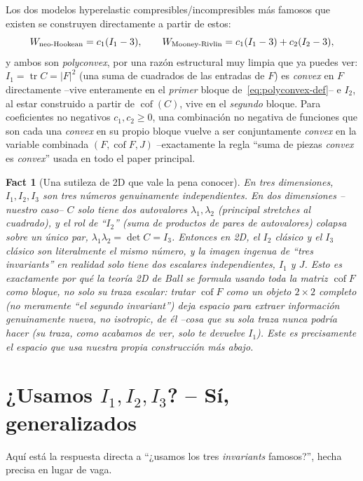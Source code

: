 \documentclass[11pt,a4paper]{article}
\newtheorem{fact}{Fact}
\newcommand{\Cof}{\operatorname{cof}}
\newcommand{\tr}{\operatorname{tr}}
\begin{document}
Los dos modelos hyperelastic compresibles/incompresibles m\'as famosos
que existen se construyen directamente a partir de estos:
\[
 W_{\rm neo\text{-}Hookean}=c_1(I_1-3), \qquad
 W_{\rm Mooney\text{-}Rivlin}=c_1(I_1-3)+c_2(I_2-3),
\]
y ambos son \emph{polyconvex}, por una raz\'on estructural muy limpia
que ya puedes ver: $I_1=\tr C=|F|^2$ (una suma de cuadrados de las
entradas de $F$) es \emph{convex} en $F$ directamente --vive
enteramente en el \emph{primer} bloque de~\eqref{eq:polyconvex-def}-- e
$I_2$, al estar construido a partir de $\Cof(C)$, vive en el
\emph{segundo} bloque. Para coeficientes no negativos $c_1,c_2\geq0$,
una combinaci\'on no negativa de funciones que son cada una \emph{convex}
en su propio bloque vuelve a ser conjuntamente \emph{convex} en la
variable combinada $(F,\Cof F,J)$ --exactamente la regla ``suma de
piezas \emph{convex} es \emph{convex}'' usada en todo el paper
principal.

\begin{fact}[Una sutileza de 2D que vale la pena conocer]
\label{fact:2d-degeneracy}
En tres dimensiones, $I_1,I_2,I_3$ son tres n\'umeros genuinamente
independientes. En dos dimensiones --nuestro caso-- $C$ solo tiene dos
autovalores $\lambda_1,\lambda_2$ (principal stretches al cuadrado), y
el rol de ``$I_2$'' (suma de productos de pares de autovalores) colapsa
sobre un \'unico par, $\lambda_1\lambda_2=\det C=I_3$. Entonces en 2D,
el $I_2$ cl\'asico y el $I_3$ cl\'asico son literalmente el mismo
n\'umero, y la imagen ingenua de ``tres \emph{invariants}'' en realidad
solo tiene dos escalares independientes, $I_1$ y $J$. Esto es
exactamente por qu\'e la teor\'ia 2D de Ball se formula usando toda la
\emph{matriz} $\Cof F$ como bloque, no solo su traza escalar: tratar
$\Cof F$ como un objeto $2\times2$ completo (no meramente ``el segundo
\emph{invariant}'') deja espacio para extraer informaci\'on
genuinamente nueva, no isotropic, de \'el --cosa que su sola traza
nunca podr\'ia hacer (su traza, como acabamos de ver, solo te devuelve
$I_1$). Este es precisamente el espacio que usa nuestra propia
construcci\'on m\'as abajo.
\end{fact}

\section{¿Usamos $I_1,I_2,I_3$? -- S\'i, generalizados}
\label{sec:are-we-using-them}

Aqu\'i est\'a la respuesta directa a ``¿usamos los tres \emph{invariants}
famosos?'', hecha precisa en lugar de vaga.
\end{document}
